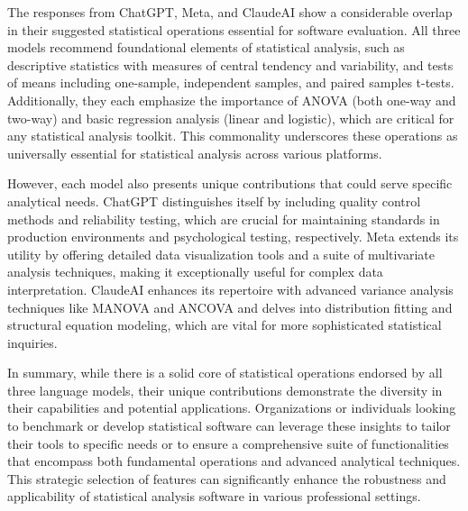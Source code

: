 \documentclass{article}
\begin{document}
The responses from ChatGPT, Meta, and ClaudeAI show a considerable overlap in their suggested statistical operations essential for software evaluation. All three models recommend foundational elements of statistical analysis, such as descriptive statistics with measures of central tendency and variability, and tests of means including one-sample, independent samples, and paired samples t-tests. Additionally, they each emphasize the importance of ANOVA (both one-way and two-way) and basic regression analysis (linear and logistic), which are critical for any statistical analysis toolkit. This commonality underscores these operations as universally essential for statistical analysis across various platforms.

However, each model also presents unique contributions that could serve specific analytical needs. ChatGPT distinguishes itself by including quality control methods and reliability testing, which are crucial for maintaining standards in production environments and psychological testing, respectively. Meta extends its utility by offering detailed data visualization tools and a suite of multivariate analysis techniques, making it exceptionally useful for complex data interpretation. ClaudeAI enhances its repertoire with advanced variance analysis techniques like MANOVA and ANCOVA and delves into distribution fitting and structural equation modeling, which are vital for more sophisticated statistical inquiries.

In summary, while there is a solid core of statistical operations endorsed by all three language models, their unique contributions demonstrate the diversity in their capabilities and potential applications. Organizations or individuals looking to benchmark or develop statistical software can leverage these insights to tailor their tools to specific needs or to ensure a comprehensive suite of functionalities that encompass both fundamental operations and advanced analytical techniques. This strategic selection of features can significantly enhance the robustness and applicability of statistical analysis software in various professional settings.
\end{document}
